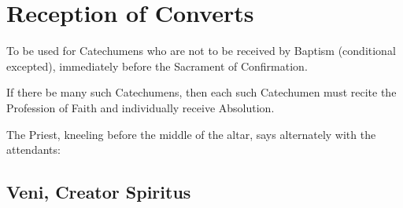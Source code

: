 \section{Reception of Converts}
\fancyhead[RE,LO]{}
\begin{secrubric}
    To be used for Catechumens who are not to be received by Baptism (conditional excepted), immediately before the Sacrament of Confirmation.
\end{secrubric}
\begin{secrubric}
    If there be many such Catechumens, then each such Catechumen must recite the Profession of Faith and individually receive Absolution.
\end{secrubric}
\begin{secrubric}
    The Priest, kneeling before the middle of the altar, says alternately with the attendants:
\end{secrubric}
\subsection{Veni, Creator Spiritus}

\vspace{-1\baselineskip}

